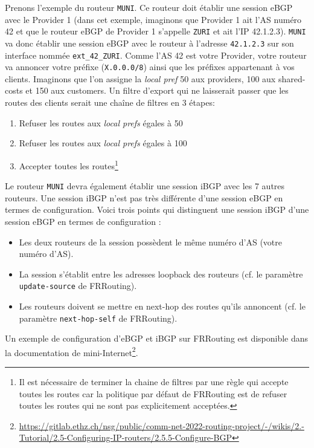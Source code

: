 \documentclass[a4paper, 11pt]{article}
\begin{document}
Prenons l'exemple du routeur \texttt{MUNI}. Ce routeur doit
établir une session eBGP avec le Provider 1 (dans cet exemple,
imaginons que Provider 1 ait l'AS numéro 42 et que le routeur eBGP
de Provider 1 s'appelle \texttt{ZURI} et ait l'IP 42.1.2.3).
\texttt{MUNI} va donc établir une session eBGP avec le routeur
à l'adresse \texttt{42.1.2.3} sur son interface nommée
\texttt{ext\_42\_ZURI}. Comme l'AS 42 est votre Provider, votre
routeur va annoncer votre préfixe (\texttt{X.0.0.0/8}) ainsi que
les préfixes appartenant à vos clients.
Imaginons que l'on assigne la \textit{local pref} 50 aux providers, 100 aux
shared-costs et 150 aux customers. Un filtre d'export qui ne laisserait
passer que les routes des clients serait une chaîne de filtres en 3
étapes:
\begin{enumerate}
    \item Refuser les routes aux \textit{local prefs} égales à 50
    \item Refuser les routes aux \textit{local prefs} égales à 100
    \item Accepter toutes les routes\footnote{Il est nécessaire
    de terminer la chaine de filtres par une règle qui accepte
    toutes les routes car la politique par défaut de FRRouting est
    de refuser toutes les routes qui ne sont pas explicitement
    acceptées.}
\end{enumerate}

Le routeur \texttt{MUNI} devra également établir une session iBGP
avec les 7 autres routeurs. Une session iBGP n'est pas très différente
d'une session eBGP en termes de configuration. Voici trois points
qui distinguent une session iBGP d'une session eBGP en termes de configuration :

\begin{itemize}
    \item Les deux routeurs de la session possèdent le même numéro d'AS
          (votre numéro d'AS).
    \item La session s'établit entre les adresses loopback des routeurs
          (cf. le paramètre \texttt{update-source} de FRRouting).
    \item Les routeurs doivent se mettre en next-hop des routes qu'ils
          annoncent (cf. le paramètre \texttt{next-hop-self} de FRRouting).
\end{itemize}

Un exemple de configuration d'eBGP et iBGP sur FRRouting
est disponible dans la documentation de
mini-Internet\footnote{\url{https://gitlab.ethz.ch/nsg/public/comm-net-2022-routing-project/-/wikis/2.-Tutorial/2.5-Configuring-IP-routers/2.5.5-Configure-BGP}}.
\end{document}
